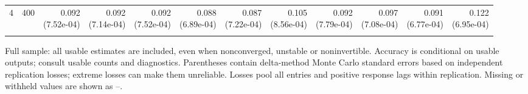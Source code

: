 \begin{table}[p]
{\begin{tabular}{llrrrrrrrrrr}
4 & 400 & \shortstack{0.092\\(7.52e-04)} & \shortstack{0.092\\(7.14e-04)} & \shortstack{0.092\\(7.52e-04)} & \shortstack{0.088\\(6.89e-04)} & \shortstack{0.087\\(7.22e-04)} & \shortstack{0.105\\(8.56e-04)} & \shortstack{0.092\\(7.79e-04)} & \shortstack{0.097\\(7.08e-04)} & \shortstack{0.091\\(6.77e-04)} & \shortstack{0.122\\(6.95e-04)} \\
\addlinespace
\bottomrule\end{tabular}}
\par\medskip
\begin{minipage}{\linewidth}\footnotesize Full sample: all usable estimates are included, even when nonconverged, unstable or noninvertible. Accuracy is conditional on usable outputs; consult usable counts and diagnostics. Parentheses contain delta-method Monte Carlo standard errors based on independent replication losses; extreme losses can make them unreliable. Losses pool all entries and positive response lags within replication. Missing or withheld values are shown as --.\end{minipage}
\end{table}

